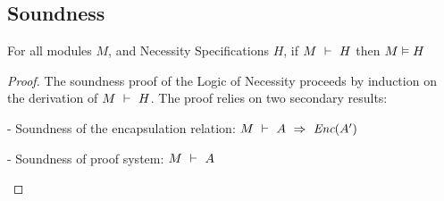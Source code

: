 \subsection{Soundness}
\begin{theorem}[Soundness]
For all modules $M$, and Necessity Specifications $H$, if
$M\ \vdash\ H$ then $M \vDash H$
\end{theorem}
\begin{proof}
The soundness proof of the Logic of Necessity proceeds by 
induction on the derivation of $M\ \vdash\ H$.
The proof relies on two secondary results:
\begin{description}
\item - Soundness of the encapsulation relation: $M\ \vdash\ A\ \Rightarrow\ \textit{Enc}(A')$
\item - Soundness of \SpecO proof system: $M\ \vdash\ A$
\end{description}
\end{proof}
